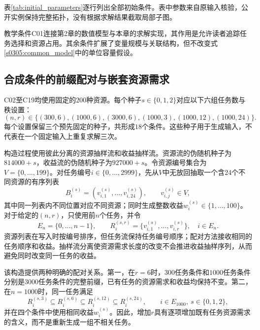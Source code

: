表\ref{tab:initial_parameters}逐行列出全部初始条件。表中参数来自原输入核验，公开实例保持完整拓扑，没有根据求解结果截取局部子图。



教学条件C01连接第2章的数值模型与本章的求解实现，其作用是允许读者追踪任务选择和资源占用。其余条件扩展了变量规模与关联结构，但不改变式\eqref{s0305:common_model}中的单位容量假设。

\subsection{合成条件的前缀配对与嵌套资源需求}

C02至C19均使用固定的$200$种资源。每个种子$s\in\{0,1,2\}$对应以下六组任务数与秩设置：
\begin{equation}
 (n,r)\in\{(300,6),(1000,6),(3000,6),
 (1000,3),(1000,12),(1000,24)\}.
 \label{s0305:synthetic_settings}
\end{equation}
每个设置保留三个预先固定的种子，共形成$18$个条件。这些种子用于生成输入，不代表在一个固定输入上重复求解三次。

构造过程使用彼此分离的资源抽样流和收益抽样流。资源流的伪随机种子为$814000+s$，收益流的伪随机种子为$927000+s$。令资源编号集合为$V=\{0,\ldots,199\}$。对任务编号$i\in\{0,\ldots,2999\}$，先从$V$中无放回抽取一个含$24$个不同资源的有序列表
\begin{equation}
 B_i^{(s)}=(v_{i,1}^{(s)},\ldots,v_{i,24}^{(s)}),
 \qquad v_{i,j}^{(s)}\in V,
 \label{s0305:resource_list}
\end{equation}
其中同一列表内不同位置对应不同资源；同时生成整数收益$w_i^{(s)}\in\{1,\ldots,100\}$。对于给定的$(n,r)$，只使用前$n$个任务，并令
\begin{equation}
 E_n=\{0,\ldots,n-1\},\qquad
 R_i^{(s,r)}=\{v_{i,1}^{(s)},\ldots,v_{i,r}^{(s)}\},
 \quad i\in E_n.
 \label{s0305:synthetic_input}
\end{equation}
资源列表在写入时按编号排序，但任务流保持任务编号顺序；配对方法接收相同的任务顺序和收益。抽样流分离使资源需求长度的改变不会推进收益抽样序列，从而避免同时改变同一任务的收益。

该构造提供两种明确的配对关系。第一，在$r=6$时，$300$任务条件和$1000$任务条件分别是$3000$任务条件的完整前缀，已有任务的资源需求和收益均保持不变。第二，在$n=1000$时，同一任务满足
\begin{equation}
 R_i^{(s,3)}\subseteq R_i^{(s,6)}
 \subseteq R_i^{(s,12)}\subseteq R_i^{(s,24)},
 \qquad i\in E_{1000},\ s\in\{0,1,2\},
 \label{s0305:nested_resources}
\end{equation}
并在四个条件中使用相同收益$w_i^{(s)}$。因此，增加$r$具有逐项增加既有任务资源需求的含义，而不是重新生成一组不相关任务。

